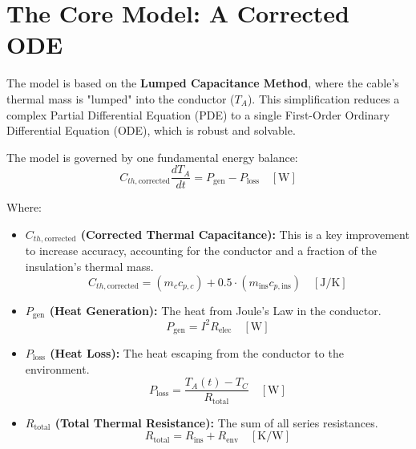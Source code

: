 \documentclass[11pt, a4paper]{article}
\begin{document}

\section{The Core Model: A Corrected ODE}

The model is based on the \textbf{Lumped Capacitance Method}, where the cable's thermal mass is "lumped" into the conductor ($T_A$). This simplification reduces a complex Partial Differential Equation (PDE) to a single First-Order Ordinary Differential Equation (ODE), which is robust and solvable.

The model is governed by one fundamental energy balance:
$$ C_{th,\text{corrected}} \frac{dT_A}{dt} = P_{\text{gen}} - P_{\text{loss}} \quad [\si{\watt}] $$

Where:
\begin{itemize}
    \item \textbf{$C_{th,\text{corrected}}$ (Corrected Thermal Capacitance):} This is a key improvement to increase accuracy, accounting for the conductor and a fraction of the insulation's thermal mass.
    \begin{equation}
        C_{th,\text{corrected}} = (m_c c_{p,c}) + 0.5 \cdot (m_{\text{ins}} c_{p,\text{ins}}) \quad [\si{\joule\per\kelvin}]
    \end{equation}

    \item \textbf{$P_{\text{gen}}$ (Heat Generation):} The heat from Joule's Law in the conductor.
    \begin{equation}
        P_{\text{gen}} = I^2 R_{\text{elec}} \quad [\si{\watt}]
    \end{equation}

    \item \textbf{$P_{\text{loss}}$ (Heat Loss):} The heat escaping from the conductor to the environment.
    \begin{equation}
        P_{\text{loss}} = \frac{T_A(t) - T_C}{R_{\text{total}}} \quad [\si{\watt}]
    \end{equation}

    \item \textbf{$R_{\text{total}}$ (Total Thermal Resistance):} The sum of all series resistances.
    \begin{equation}
        R_{\text{total}} = R_{\text{ins}} + R_{\text{env}} \quad [\si{\kelvin\per\watt}]
    \end{equation}
\end{itemize}
\end{document}
